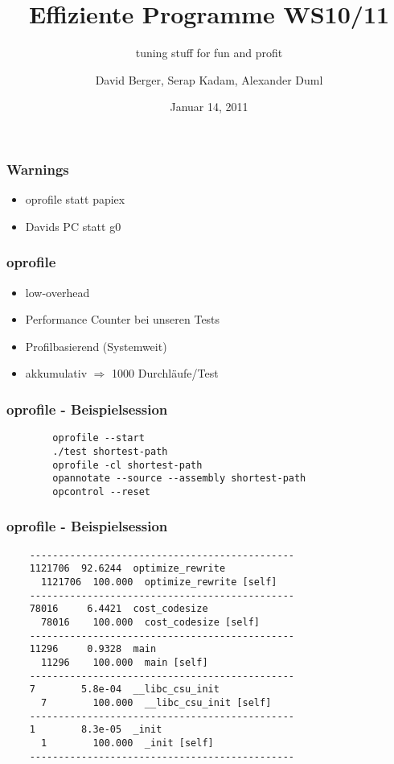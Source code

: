 \documentclass{beamer}[20pt]
\title[EP1011]{Effiziente Programme WS10/11}
\subtitle[Tuning]{tuning stuff for fun and profit}
\author[D. Berger, S. Kadam, A. Duml]{David Berger, Serap Kadam, Alexander Duml}
\date[Januar 2011]{Januar 14, 2011}
\begin{document}
\begin{frame}
    \titlepage
\end{frame}

\begin{frame}
    \frametitle{Warnings}
    \begin{itemize}
        \item oprofile statt papiex
        \item Davids PC statt g0
    \end{itemize}
\end{frame}

\begin{frame}
    \frametitle{oprofile}
    \begin{itemize}
        \item low-overhead
        \item Performance Counter bei unseren Tests
        \item Profilbasierend (Systemweit)
        \item akkumulativ $\Rightarrow$ 1000 Durchläufe/Test
    \end{itemize}
\end{frame}

\begin{frame}[fragile]
    \frametitle{oprofile - Beispielsession}
        \begin{lstlisting}
        oprofile --start
        ./test shortest-path
        oprofile -cl shortest-path
        opannotate --source --assembly shortest-path
        opcontrol --reset
        \end{lstlisting}
\end{frame}

\begin{frame}[fragile]
    \frametitle{oprofile - Beispielsession}
    \begin{lstlisting}
    ----------------------------------------------
    1121706  92.6244  optimize_rewrite
      1121706  100.000  optimize_rewrite [self]
    ----------------------------------------------
    78016     6.4421  cost_codesize
      78016    100.000  cost_codesize [self]
    ----------------------------------------------
    11296     0.9328  main
      11296    100.000  main [self]
    ----------------------------------------------
    7        5.8e-04  __libc_csu_init
      7        100.000  __libc_csu_init [self]
    ----------------------------------------------
    1        8.3e-05  _init
      1        100.000  _init [self]
    ----------------------------------------------
    \end{lstlisting}
\end{frame}
\end{document}
